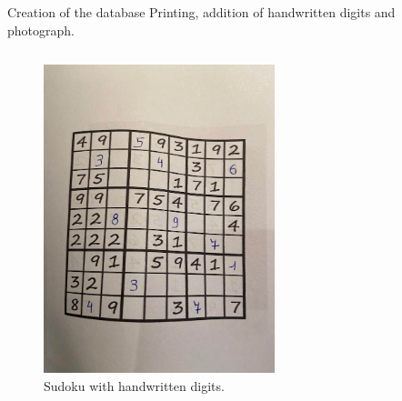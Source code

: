 \documentclass[12pt, dvipsnames]{beamer}
\begin{document}
\begin{frame}{Creation of the database}
    Printing, addition of handwritten digits and photograph.
    \begin{columns}
        \begin{figure}
            \centering
            \includegraphics[width=0.6\textwidth]{resources/sudoku/sudoku_0025_00.jpg}
            \caption{Sudoku with handwritten digits.}
        \end{figure}
        
    \end{columns}
\end{frame}
\end{document}
